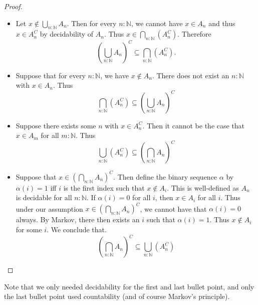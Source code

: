 \documentclass{../util/zariski-small}
\begin{document}
\begin{proof}
\begin{itemize}
  \item 
    Let 
    $x\notin \bigcup_{n:\mathbb N} A_n$. 
    Then for every $n:\mathbb N$, we cannot have $x\in A_n$
    and thus $x\in A_n^C$ by decidability of $A_n$. 
    Thus $x\in \bigcap_{n:\mathbb N} (A_n^C)$. 
    Therefore
    $$
    (\bigcup_{n:\mathbb N} A_n)^C
    \subseteq 
    \bigcap_{n:\mathbb N} (A_n^C).
    $$ 
  \item 
    Suppose that for every $n:\mathbb N$, we have $x\notin A_n$. 
    There does not exist an $n:\mathbb N$ with $x\in A_n$. Thus
    $$
    \bigcap_{n:\mathbb N} (A_n^C)
    \subseteq 
    (\bigcup_{n:\mathbb N} A_n)^C
    $$ 
  \item 
    Suppose there exists some $n$ with $x\in A_n^C$. Then 
    it cannot be the case that $x\in A_m$ for all $m:\mathbb N$.
    Thus
    $$
    \bigcup_{n:\mathbb N} (A_n^C)
    \subseteq 
    (\bigcap_{n:\mathbb N} A_n)^C
    $$ 
  \item 
    Suppose that $x\in (\bigcap_{n:\mathbb N} A_n)^C$. 
    Then define the binary sequence $\alpha$ by $\alpha(i) =1$ iff $i$ is the first index such that 
    $x\notin A_i$. This is well-defined as $A_n$ is decidable for all $n:\mathbb N$. 
    If $\alpha(i) = 0$ for all $i$, then $x\in A_i$ for all $i$. 
    Thus under our assumption $x\in (\bigcap_{n:\mathbb N} A_n)^C$, 
    we cannot have that $\alpha(i) = 0$ always. 
    By Markov, there then exists an $i$ such that $\alpha(i) = 1$. 
    Thus $x\notin A_i$ for some $i$. We conclude that. 
    $$
    (\bigcap_{n:\mathbb N} A_n)^C
    \subseteq
    \bigcup_{n:\mathbb N} (A_n^C)
    $$ 
\end{itemize}
\end{proof} 
Note that we only needed decidability for the first and last bullet point, 
and only the last bullet point used countability (and of course Markov's principle). 
\end{document}
